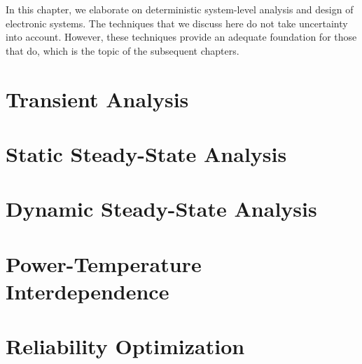 In this chapter, we elaborate on deterministic system-level analysis and design
of electronic systems. The techniques that we discuss here do not take
uncertainty into account. However, these techniques provide an adequate
foundation for those that do, which is the topic of the subsequent chapters.

\section{\introductiontitle}

\section{Transient Analysis}

\section{Static Steady-State Analysis}

\section{Dynamic Steady-State Analysis}

\section{Power-Temperature Interdependence}

\section{Reliability Optimization}

\section{\conclusiontitle}
